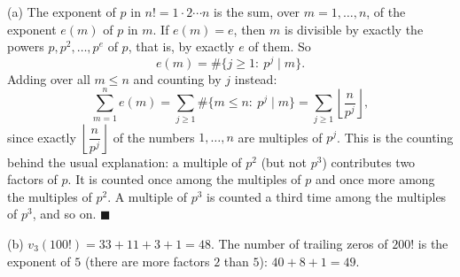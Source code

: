 (a) The exponent of $p$ in $n!=1\cdot2\cdots n$ is the sum, over $m=1,\dots,n$, of the exponent $e(m)$ of $p$ in $m$. If $e(m)=e$, then $m$ is divisible by exactly the powers $p,p^2,\dots,p^e$ of $p$, that is, by exactly $e$ of them. So
\[
e(m)=\#\{j\ge1:\ p^j\mid m\}.
\]
Adding over all $m\le n$ and counting by $j$ instead:
\[
\sum_{m=1}^n e(m)=\sum_{j\ge1}\#\{m\le n:\ p^j\mid m\}=\sum_{j\ge1}\left\lfloor\dfrac{n}{p^j}\right\rfloor ,
\]
since exactly $\left\lfloor\dfrac{n}{p^j}\right\rfloor$ of the numbers $1,\dots,n$ are multiples of $p^j$. This is the counting behind the usual explanation: a multiple of $p^2$ (but not $p^3$) contributes two factors of $p$. It is counted once among the multiples of $p$ and once more among the multiples of $p^2$. A multiple of $p^3$ is counted a third time among the multiples of $p^3$, and so on. $\blacksquare$

(b) $v_3(100!)=33+11+3+1=\boxed{48}$. The number of trailing zeros of $200!$ is the exponent of $5$ (there are more factors $2$ than $5$): $40+8+1=\boxed{49}$.

